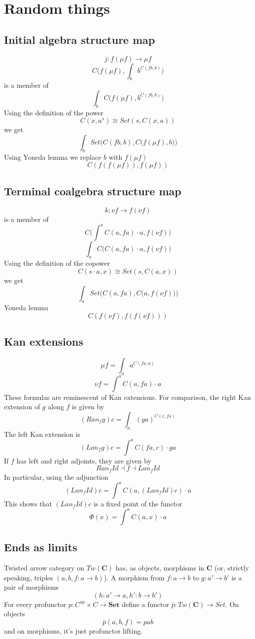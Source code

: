 \documentclass[11pt]{amsart}
\newcommand{\Cat}[1]{\mathbf{#1}}
\begin{document}
\section{Random things}
\subsection{Initial algebra structure map}
\[j \colon f (\mu f) \to \mu f\]
\[C\Big(f (\mu f), \int_b b^{C(f b, b)}\Big)\]
is a member of
\[\int_b C\Big(f (\mu f), b^{C(f b, b)}\Big)\]
Using the definition of the power
\[ C(x, a^s) \cong Set(s, C(x, a)) \]
we get
\[\int_b Set\Big(C(f b, b), C\big( f (\mu f), b\big) \Big)\]
Using Yoneda lemma we replace $b$ with $f (\mu f)$
\[C(f (f (\mu f)), f (\mu f)) \]

\subsection{Terminal coalgebra structure map}
\[k \colon \nu f \to f (\nu f)\]
is a member of
\[ C\Big( \int^a C(a, f a) \cdot a, f  (\nu f) \Big)\]
\[ \int_a C\Big( C(a, f a) \cdot a, f  (\nu f) \Big)\]
Using the definition of the copower
\[ C(s \cdot a, x) \cong Set(s, C(a, x))\]
we get
\[ \int_a Set\Big( C(a, f a), C\big( a, f  (\nu f) \big) \Big)\]
Yoneda lemma
\[ C(f(\nu f), f ( f (\nu f))) \]

\subsection{Kan extensions}
\[\mu f = \int_a a^{C(f a, a)}\]
\[\nu f = \int^a C(a, f a) \cdot a \]
These formulas are reminescent of Kan extensions. 
For comparison, the right  Kan extension of $g$ along $f$ is given by
\[(Ran_f g) c = \int_a (g a)^{C(c, f a)}\]
The left Kan extension is
\[(Lan_f g) c = \int^a C(f a, c) \cdot g a \]
If $f$ has left and right adjoints, they are given by
\[Ran_f Id \dashv f \dashv Lan_f Id\]
In particular, using the adjunction
\[(Lan_f Id) c = \int^a C(a, (Lan_f Id) c) \cdot a\]
This shows that $(Lan_f Id) c$ is a fixed point of the functor
\[ \Phi(x) = \int^a C(a, x) \cdot a \]

\subsection{Ends as limits}

Twisted arrow category on $\textit{Tw}(\Cat C)$ has, as objects, morphisms in $\Cat C$ (or, strictly speaking, triples $(a, b, f \colon a \to b)$). A morphism from $f \colon a \to b$ to $g \colon a' \to b'$ is a pair of morphisms 
\[(h \colon a' \to a, h' \colon b \to b')\]
For every profunctor $p \colon C^{op} \times C \to \Cat{Set}$ define a functor $\bar p \colon \textit{Tw}(\Cat C) \to Set$. On objects
\[\bar p (a, b, f) = p a b\]
and on morphisms, it's just profunctor lifting.
\end{document}
